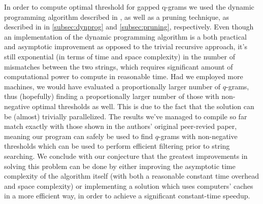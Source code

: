 \documentclass[paper=a4, fontsize=11pt]{scrartcl} %
\numberwithin{equation}{section} %
\numberwithin{figure}{section} %
\numberwithin{table}{section} %
\begin{document}
In order to compute optimal threshold for gapped q-grams we used the 
dynamic programming algorithm described in \cite{njihovPaper}, as well as a pruning technique, as described in
in \ref{subsec:dynprog} and \ref{subsec:pruning}, respectively. Even though an
implementation of the dynamic programming algorithm is a both practical and
asymptotic improvement as opposed to the trivial recursive approach, it's still
exponential (in terms of time and space complexity) in the number of mismatches
between the two strings, which requires significant amount of computational
power to compute in reasonable time. Had we employed more machines, we would
have evaluated a proportionally larger number of $q$-grams, thus (hopefully)
finding a proportionally larger number of those with non-negative optimal thresholds as well. This is due to the fact that the solution can be (almost) trivially parallelized. The results we've managed to compile so far match exactly with those shown in the authors' original peer-revied paper, meaning our program can safely be used to find $q$-grams with non-negative thresholds which can be used to perform efficient filtering prior to string searching. We conclude with our conjecture that the greatest improvements in solving this problem can be done by either improving the asymptotic time complexity of the algorithm itself (with both a reasonable constant time overhead and space complexity) or implementing a solution which uses computers' caches in a more efficient way, in order to achieve a significant constant-time speedup.




\end{document}
